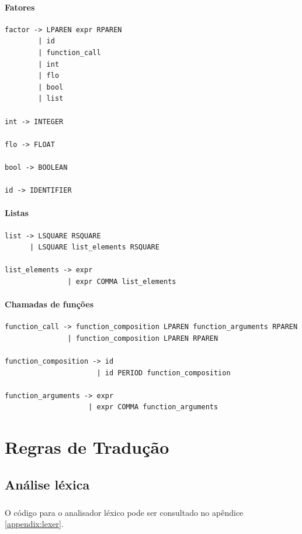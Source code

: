\documentclass[11pt,a4paper]{report}
\begin{document}
\subsubsection{Fatores}
\begin{verbatim}
factor -> LPAREN expr RPAREN
        | id
        | function_call
        | int
        | flo
        | bool
        | list

int -> INTEGER

flo -> FLOAT

bool -> BOOLEAN

id -> IDENTIFIER
\end{verbatim}

\subsubsection{Listas}

\begin{verbatim}
list -> LSQUARE RSQUARE
      | LSQUARE list_elements RSQUARE
       
list_elements -> expr
               | expr COMMA list_elements
\end{verbatim}

\subsubsection{Chamadas de funções}

\begin{verbatim}
function_call -> function_composition LPAREN function_arguments RPAREN
               | function_composition LPAREN RPAREN 
                  
function_composition -> id
                      | id PERIOD function_composition

function_arguments -> expr
                    | expr COMMA function_arguments                         
\end{verbatim}


\chapter{Regras de Tradução}

\section{Análise léxica}
\paragraph*{}
O código para o analisador léxico pode ser consultado no apêndice \ref{appendix:lexer}.
\end{document}
